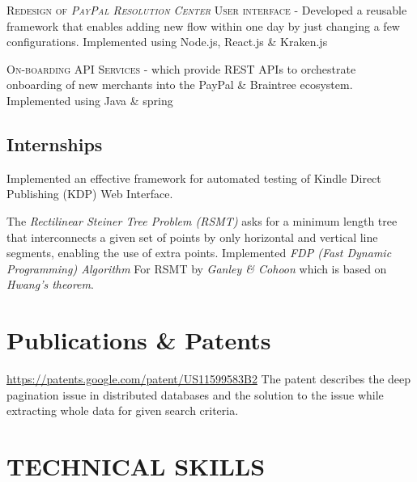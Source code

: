 \documentclass[11pt, a4paper, sans]{moderncv}
\begin{document}
{\textsc{Redesign of \textit{PayPal Resolution Center} User interface} - Developed a reusable framework that enables adding new flow within one day by just changing a few configurations. Implemented using Node.js, React.js \& Kraken.js \newline} 

{\textsc{On-boarding API Services} - which provide REST APIs to orchestrate onboarding of new merchants into the PayPal \& Braintree ecosystem. Implemented using Java \& spring \newline} 

\subsection{Internships}
{Implemented an effective framework for automated testing of Kindle Direct Publishing (KDP) Web Interface.}

{The \textit{Rectilinear Steiner Tree Problem (RSMT)} asks for a minimum length tree that interconnects a given set of points by only horizontal and vertical line segments, enabling the use of extra points. Implemented \textit{ FDP (Fast Dynamic Programming) Algorithm } For RSMT by \textit{ Ganley \& Cohoon } which is based on \textit{ Hwang’s theorem}}.

\section{Publications \& Patents}
{\url{https://patents.google.com/patent/US11599583B2} \newline The patent describes the deep pagination issue in distributed databases and the solution to the issue while extracting whole data for given search criteria.}

\section{TECHNICAL SKILLS}
\end{document}
